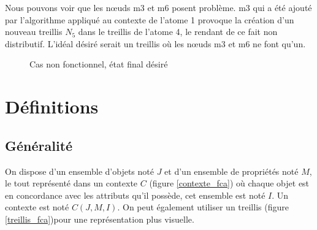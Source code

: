 Nous pouvons voir que les n\oe uds m3 et m6 posent problème. m3 qui a été ajouté par l'algorithme appliqué au contexte de l'atome 1 provoque la création d'un nouveau treillis $N_5$ dans le treillis de l'atome 4, le rendant de ce fait non distributif. L'idéal désiré serait un treillis où les n\oe uds m3 et m6 ne font qu'un.

\begin{figure}[H]
	\begin{center}
	\end{center}
	\caption{Cas non fonctionnel, état final désiré}
\end{figure}

\chapter{Définitions}

\section*{Généralité}

On dispose d'un ensemble d'objets noté $J$ et d'un ensemble de propriétés noté $M$, le tout représenté dans un contexte $C$ (figure \ref{contexte_fca}) où chaque objet est en concordance avec les attributs qu'il possède, cet ensemble est noté $I$. Un contexte est noté $C(J, M, I)$. On peut également utiliser un treillis (figure \ref{treillis_fca})pour une représentation plus visuelle.

